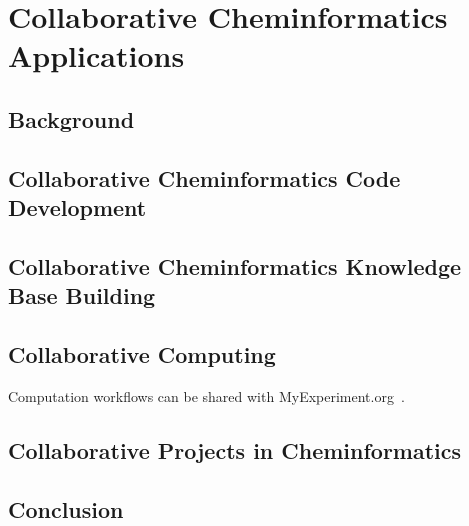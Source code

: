 \documentclass[12pt]{book}
\begin{document}
\chapter{Collaborative Cheminformatics Applications}

\section{Background}

\section{Collaborative Cheminformatics Code Development}

\section{Collaborative Cheminformatics Knowledge Base Building}

\section{Collaborative Computing}

Computation workflows can be shared with MyExperiment.org~\cite{Goble2010}.

\section{Collaborative Projects in Cheminformatics}

\section{Conclusion}





\end{document}
